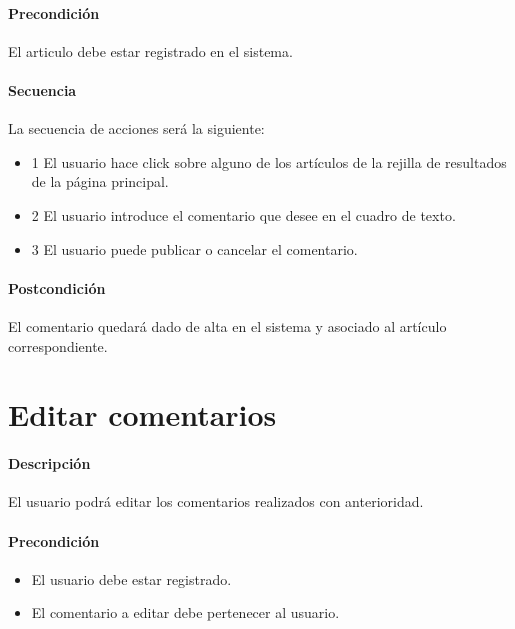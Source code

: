 \paragraph{Precondición} El articulo debe estar registrado en el sistema.

\paragraph{Secuencia} La secuencia de acciones será la siguiente:

\begin{itemize}
	\item 1 El usuario hace click sobre alguno de los artículos de la rejilla de resultados de la página principal.
	\item 2 El usuario introduce el comentario que desee en el cuadro de texto.
	\item 3 El usuario puede publicar o cancelar el comentario.
\end{itemize}
	
\paragraph{Postcondición} El comentario quedará dado de alta en el sistema y asociado al artículo correspondiente.


\section{Editar comentarios}

\paragraph{Descripción} El usuario podrá editar los comentarios realizados con anterioridad.

\paragraph{Precondición} 
\begin{itemize}
	\item El usuario debe estar registrado.
	\item El comentario a editar debe pertenecer al usuario.
\end{itemize}

